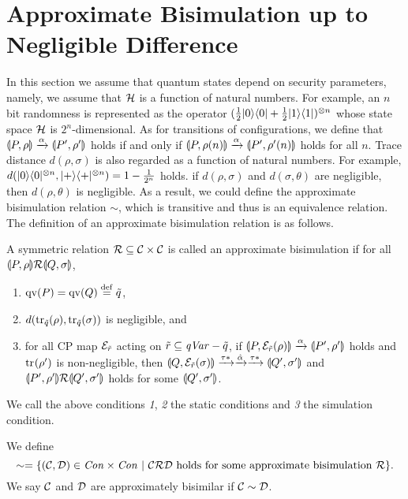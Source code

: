 \section{Approximate Bisimulation up to Negligible Difference}
\label{neg}
In this section we assume that quantum states depend on
security parameters, namely, 
we assume that $\mathcal{H}$ is a function of natural numbers.
For example, an $n$ bit randomness is represented as
the operator 
$(\frac{1}{2}|0\rangle\langle 0| + \frac{1}{2}|1\rangle\langle 1|)^{\otimes n}$
whose state space $\mathcal{H}$ is $2^n$-dimensional.
As for transitions of configurations, we define
that $\llparenthesis P, \rho \rrparenthesis \xrightarrow{\alpha} \llparenthesis P', \rho' \rrparenthesis$ holds if and
only if 
$\llparenthesis P, \rho(n) \rrparenthesis \xrightarrow{\alpha} \llparenthesis P', \rho'(n) \rrparenthesis$ holds 
for all $n$. Trace distance
$d(\rho, \sigma)$ is also regarded as a
function of natural numbers.
For example, $d(|0\rangle\langle 0|^{\otimes n}, |+\rangle\langle +|^{\otimes n})
= 1 - \frac{1}{2^n}$ holds.
if $d(\rho, \sigma)$ and $d(\sigma, \theta)$ are negligible,
then $d(\rho, \theta)$ is negligible. 
As a result, we could define the
approximate bisimulation relation $\sim$, which is
transitive and thus is an equivalence relation.
The definition of an approximate bisimulation relation 
is as follows.
\begin{defi}
\label{neg:defofapproxbisim}
 A symmetric relation $\mathcal{R} \subseteq \mathcal{C} \times \mathcal{C}$ is called an
 approximate bisimulation
 if for all $\llparenthesis P, \rho \rrparenthesis \mathcal{R} \llparenthesis Q, \sigma \rrparenthesis$,
 \begin{enumerate}
  \item $\mathrm{qv}(P) = \mathrm{qv}(Q) \overset{\mathrm{def}}{=} \tilde q$,
  \item $d({\rm tr}_{\tilde q}(\rho), {\rm tr}_{\tilde q}(\sigma))$ 
	is negligible, and
  \item for all CP map $\mathcal{E}_{\tilde r}$ acting
	on $\tilde r \subseteq \mathit{qVar} - \tilde q$,
	if $\llparenthesis P, \mathcal{E}_{\tilde r}(\rho) \rrparenthesis
	\xrightarrow{\alpha}
	\llparenthesis P', \rho' \rrparenthesis$ holds and ${\rm tr}_{}(\rho')$ is
	non-negligible, then
	$\llparenthesis Q, \mathcal{E}_{\tilde r}(\sigma) \rrparenthesis \xrightarrow{\tau*} \xrightarrow{\hat \alpha} \xrightarrow{\tau*}
	\llparenthesis Q', \sigma' \rrparenthesis$ and
	$\llparenthesis P', \rho' \rrparenthesis \mathcal{R} \llparenthesis Q', \sigma' \rrparenthesis$ holds for
	some $\llparenthesis Q', \sigma' \rrparenthesis$. 
 \end{enumerate}
\end{defi}
We call the above conditions {\it 1}, {\it 2} the static conditions and
{\it 3} the simulation condition.

\begin{defi}
\label{neg:defofapprox}
 We define 
 \[
 \sim = \{(\mathcal{C}, \mathcal{D}) \in 
 \mathit{Con} \times \mathit{Con}~|~
 \mathcal{C}\mathcal{R}\mathcal{D} \mbox{ holds for some approximate bisimulation } \mathcal{R} \}.
 \]
 We say $\mathcal{C}$ and $\mathcal{D}$ are approximately bisimilar if
 $\mathcal{C} \sim \mathcal{D}$. 
\end{defi}

